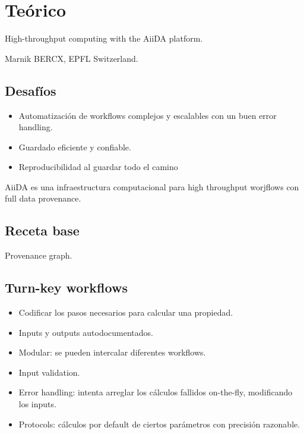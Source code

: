 \section{Teórico}

   High-throughput computing with the AiiDA platform.

   Marnik BERCX, EPFL Switzerland.

\subsection{Desafíos}

  \begin{itemize}
    \item Automatización de workflows complejos y escalables con un buen error handling.
    \item Guardado eficiente y confiable.
    \item Reproducibilidad al guardar todo el camino
  \end{itemize}

  AiiDA es una infraestructura computacional para high throughput worjflows con full data provenance.

\subsection{Receta base}




  Provenance graph.

\subsection{Turn-key workflows}

  \begin{itemize}
    \item Codificar los pasos necesarios para calcular una propiedad.
    \item Inputs y outputs autodocumentados.
    \item Modular: se pueden intercalar diferentes workflows.
    \item Input validation.
    \item Error handling: intenta arreglar los cálculos fallidos on-the-fly, modificando los inputs.
    \item Protocols: cálculos por default de ciertos parámetros con precisión razonable.
  \end{itemize}

